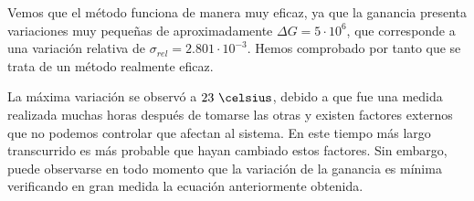 Vemos que el método funciona de manera muy eficaz, ya que la ganancia presenta variaciones muy pequeñas de aproximadamente $\Delta G=5 \cdot 10^6$, que corresponde a una variación relativa de $\sigma_{rel}=2.801 \cdot 10^{-3} $. Hemos comprobado por tanto que se trata de un método realmente eficaz.

La máxima variación se observó a $23~\celsius$, debido a que fue una medida realizada muchas horas después de tomarse las otras y existen factores externos que no podemos controlar que afectan al sistema. En este tiempo más largo transcurrido es más probable que hayan cambiado estos factores. Sin embargo, puede observarse en todo momento que la variación de la ganancia es mínima verificando en gran medida la ecuación anteriormente obtenida.

